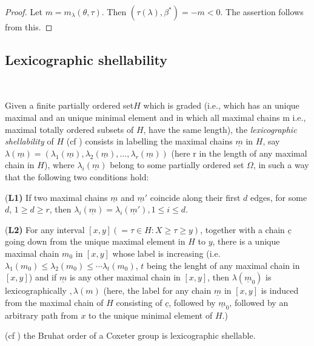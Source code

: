 \begin{proof}
Let $m=m_{\lambda}(\theta,\tau)$. Then $(\tau(\lambda), \beta^{*})= -m < 0$. The assertion follows from this.
\end{proof}

\setcounter{subsection}{5}
\subsection{Lexicographic shellability}\label{art9-subsec-2.6}
~

Given a finite partially ordered set$H$ which is graded (i.e., which has an unique maximal and an unique minimal element and in which all maximal chains m i.e., maximal totally ordered subsets of $H$, have the same length), the
\textit{lexicographic shellability} of $H$ (cf \cite{art9-keyB-W}) consists in labelling the maximal chains $\underline{m}$ in $H$, say $\lambda(\underline{m})= (\lambda_{1}(\underline{m}), \lambda_{2}(\underline{m}), \ldots, \lambda_{r}(\underline{m}))$ (here r in the length of any maximal chain in $H$), where $\lambda_{i}(\underline{m})$ belong to some partially ordered set $\Omega$, in such a way that the following two conditions hold:

\noindent
{(\bf L1)} If two maximal chains $\underline{m}$ and $\underline{m}'$ coincide along their first $d$ edges, for some $d$, $1 \geq d \geq r$, then $\lambda_{i}(\underline{m})= \lambda_{i}(\underline{m}'), 1 \leq i \leq d$.

\noindent
{(\bf L2)} For any interval $[x,y](= \tau \in H : X\geq \tau \geq y)$, together with a chain $\underline{c}$ going down from the unique maximal element in $H$ to $y$, there is a unique maximal chain $m_{0}$ in $[x,y]$ whose label is increasing (i.e. $\lambda_{1}(m_{0})\leq \lambda_{2}(m_{0})\leq \cdots \lambda_{t}(m_{0})$, $t$ being the lenght of any maximal chain in $[x,y]$) and if $\underline{m}$ is any other maximal chain in $[x,y]$, then $\lambda(\underline{m}_{0})$ is lexicographically $, \lambda(m)$ (here, the label for any chain $\underline{m}$ in $[x,y]$ is induced from the maximal chain of $H$ consisting of $\underline{c}$, followed by $\underline{m}_{0}$, followed by an arbitrary path from $x$ to the unique minimal element of $H$.) 

\setcounter{equation}{6}
\begin{theorem}\label{art9-thm-2.7}
 {\rm(cf \cite{art9-keyB-W})} the Bruhat order of a Coxeter group is lexicographic shellable.
\end{theorem}

